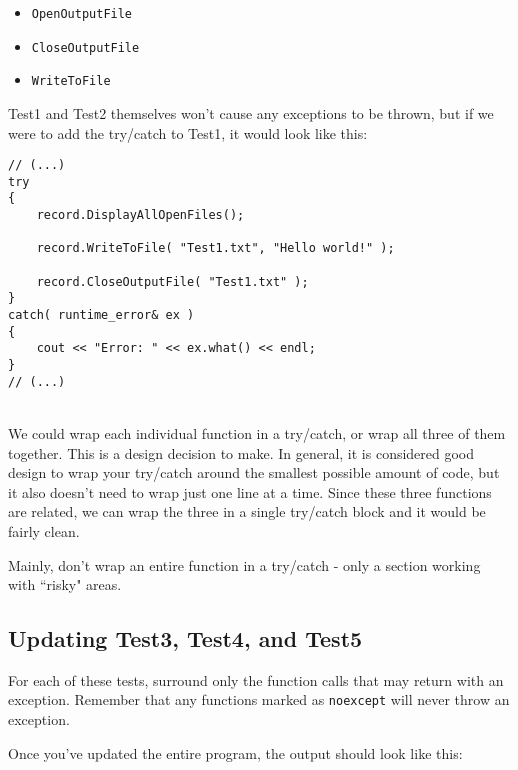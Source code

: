 \documentclass[a4paper,12pt]{book}
\begin{document}
            \begin{itemize}
                \item \texttt{OpenOutputFile}
                \item \texttt{CloseOutputFile}
                \item \texttt{WriteToFile}
            \end{itemize}

            Test1 and Test2 themselves won't cause any exceptions to be
            thrown, but if we were to add the try/catch to Test1, it would
            look like this:
            
\begin{lstlisting}[style=code]
// (...)
try
{
    record.DisplayAllOpenFiles();
    
    record.WriteToFile( "Test1.txt", "Hello world!" );
    
    record.CloseOutputFile( "Test1.txt" );
}
catch( runtime_error& ex )
{
    cout << "Error: " << ex.what() << endl;
}
// (...)
\end{lstlisting}

            ~\\
            We could wrap each individual function in a try/catch,
            or wrap all three of them together. This is a design decision
            to make. In general, it is considered good design to wrap your
            try/catch around the smallest possible amount of code,
            but it also doesn't need to wrap just one line at a time.
            Since these three functions are related, we can wrap the three
            in a single try/catch block and it would be fairly clean.

            Mainly, don't wrap an entire function in a try/catch -
            only a section working with ``risky" areas.

            \subsection*{Updating Test3, Test4, and Test5}
            For each of these tests, surround only the function calls
            that may return with an exception. Remember that any
            functions marked as \texttt{noexcept} will never throw
            an exception.

            Once you've updated the entire program, the output should
            look like this:
\end{document}
